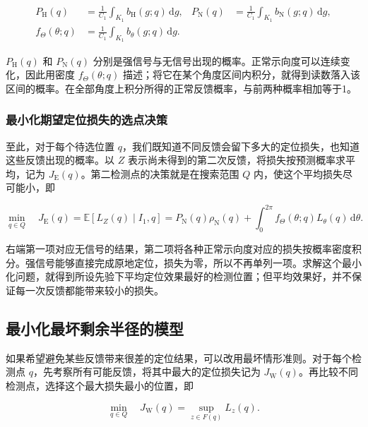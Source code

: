 \begin{equation}
\begin{aligned}
 P_{\mathrm H}(q)&=\frac{1}{C_1}\int_{K_1}b_{\mathrm H}(g;q)\,\mathrm dg,
 &P_{\mathrm N}(q)&=\frac{1}{C_1}\int_{K_1}b_{\mathrm N}(g;q)\,\mathrm dg,\\
 f_\Theta(\theta;q)&=\frac{1}{C_1}\int_{K_1}b_\theta(g;q)\,\mathrm dg.
\end{aligned}
\label{eq:q2-pair-prediction}
\end{equation}

\(P_{\mathrm H}(q)\) 和 \(P_{\mathrm N}(q)\) 分别是强信号与无信号出现的概率。正常示向度可以连续变化，因此用密度 \(f_\Theta(\theta;q)\) 描述；将它在某个角度区间内积分，就得到读数落入该区间的概率。在全部角度上积分所得的正常反馈概率，与前两种概率相加等于1。

\subsubsection{最小化期望定位损失的选点决策}

至此，对于每个待选位置 \(q\)，我们既知道不同反馈会留下多大的定位损失，也知道这些反馈出现的概率。以 \(Z\) 表示尚未得到的第二次反馈，将损失按预测概率求平均，记为 \(J_{\mathrm E}(q)\)。第二检测点的决策就是在搜索范围 \(Q\) 内，使这个平均损失尽可能小，即

\begin{equation}
 \min_{q\in Q}\quad J_{\mathrm E}(q)=\mathbb E[L_Z(q)\mid I_1,q]
 =P_{\mathrm N}(q)\rho_{\mathrm N}(q)
 +\int_0^{2\pi}f_\Theta(\theta;q)L_\theta(q)\,\mathrm d\theta.
\label{eq:q2-pair-expected-objective}
\end{equation}

右端第一项对应无信号的结果，第二项将各种正常示向度对应的损失按概率密度积分。强信号能够直接完成原地定位，损失为零，所以不再单列一项。求解这个最小化问题，就得到所设先验下平均定位效果最好的检测位置；但平均效果好，并不保证每一次反馈都能带来较小的损失。

\subsection{最小化最坏剩余半径的模型}

如果希望避免某些反馈带来很差的定位结果，可以改用最坏情形准则。对于每个检测点 \(q\)，先考察所有可能反馈，将其中最大的定位损失记为 \(J_{\mathrm W}(q)\)。再比较不同检测点，选择这个最大损失最小的位置，即

\begin{equation}
 \min_{q\in Q}\quad J_{\mathrm W}(q)=\sup_{z\in F(q)}L_z(q).
\label{eq:q2-pair-worst-objective}
\end{equation}

